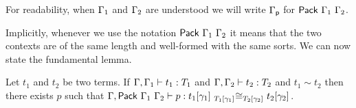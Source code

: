 For readability, when $\Ga_1$ and $\Ga_2$ are understood we will write $\Gp$ for
$\Pack{\Ga_1}{\Ga_2}$.

Implicitly, whenever we use the notation $\Pack{\Ga_1}{\Ga_2}$ it means that
the two contexts are of the same length and well-formed with the same
sorts.
%
We can now state the fundamental lemma.

\begin{lemma}
  \label{lem:sim-cong}
  Let $t_1$ and $t_2$ be two terms. If $\isterm{\Ga, \Ga_1}{t_1}{T_1}$ and
  $\isterm{\Ga, \Ga_2}{t_2}{T_2}$ and $t_1 \sim t_2$ then there exists $p$ such
  that
  $\isterm{\Ga, \Pack{\Ga_1}{\Ga_2}}
          {p}
          {\Heq{\llift{\gamma}{}{T_1}}
               {\llift{\gamma}{}{t_1}}
               {\rlift{\gamma}{}{T_2}}
               {\rlift{\gamma}{}{t_2}}}$.
\end{lemma}


